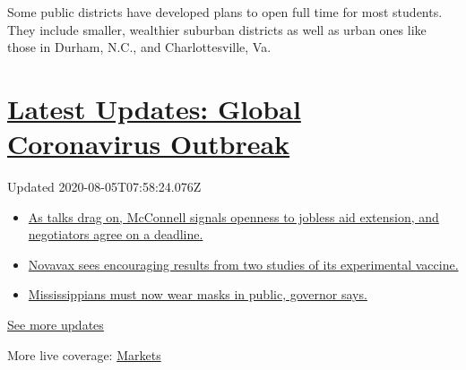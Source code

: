 Some public districts have developed plans to open full time for most
students. They include smaller, wealthier suburban districts as well as
urban ones like those in Durham, N.C., and Charlottesville, Va.

\hypertarget{latest-updates-global-coronavirus-outbreak}{%
\section{\texorpdfstring{\href{https://www.nytimes3xbfgragh.onion/2020/08/04/world/coronavirus-cases.html?action=click\&pgtype=Article\&state=default\&region=MAIN_CONTENT_1\&context=storylines_live_updates}{Latest
Updates: Global Coronavirus
Outbreak}}{Latest Updates: Global Coronavirus Outbreak}}\label{latest-updates-global-coronavirus-outbreak}}

Updated 2020-08-05T07:58:24.076Z

\begin{itemize}
\tightlist
\item
  \href{https://www.nytimes3xbfgragh.onion/2020/08/04/world/coronavirus-cases.html?action=click\&pgtype=Article\&state=default\&region=MAIN_CONTENT_1\&context=storylines_live_updates\#link-762df92}{As
  talks drag on, McConnell signals openness to jobless aid extension,
  and negotiators agree on a deadline.}
\item
  \href{https://www.nytimes3xbfgragh.onion/2020/08/04/world/coronavirus-cases.html?action=click\&pgtype=Article\&state=default\&region=MAIN_CONTENT_1\&context=storylines_live_updates\#link-1228a480}{Novavax
  sees encouraging results from two studies of its experimental
  vaccine.}
\item
  \href{https://www.nytimes3xbfgragh.onion/2020/08/04/world/coronavirus-cases.html?action=click\&pgtype=Article\&state=default\&region=MAIN_CONTENT_1\&context=storylines_live_updates\#link-794484ed}{Mississippians
  must now wear masks in public, governor says.}
\end{itemize}

\href{https://www.nytimes3xbfgragh.onion/2020/08/04/world/coronavirus-cases.html?action=click\&pgtype=Article\&state=default\&region=MAIN_CONTENT_1\&context=storylines_live_updates}{See
more updates}

More live coverage:
\href{https://www.nytimes3xbfgragh.onion/live/2020/08/04/business/stock-market-today-coronavirus?action=click\&pgtype=Article\&state=default\&region=MAIN_CONTENT_1\&context=storylines_live_updates}{Markets}

